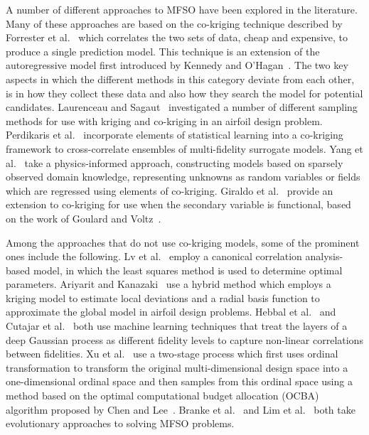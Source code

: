 \documentclass[journal]{IEEEtran}
\begin{document}
A number of different approaches to MFSO have been explored in the literature. Many of these approaches are based on the co-kriging technique described by Forrester et al.~\cite{forrester2007multi} which correlates the two sets of data, cheap and expensive, to produce a single prediction model. This technique is an extension of the autoregressive model first introduced by Kennedy and O'Hagan~\cite{kennedy2000predicting}. The two key aspects in which the different methods in this category deviate from each other, is in how they collect these data and also how they search the model for potential candidates. Laurenceau and Sagaut~\cite{laurenceau2008building} investigated a number of different sampling methods for use with kriging and co-kriging in an airfoil design problem. Perdikaris et al.~\cite{perdikaris2015multi} incorporate elements of statistical learning into a co-kriging framework to cross-correlate ensembles of multi-fidelity surrogate models. Yang et al.~\cite{yang2019physics} take a physics-informed approach, constructing models based on sparsely observed domain knowledge, representing unknowns as random variables or fields which are regressed using elements of co-kriging. Giraldo et al.~\cite{giraldo2020cokriging} provide an extension to co-kriging for use when the secondary variable is functional, based on the work of Goulard and Voltz~\cite{goulard1993geostatistical}.

Among the approaches that do not use co-kriging models, some of the prominent ones include the following. Lv et al.~\cite{lv2021multi} employ a canonical correlation analysis-based model, in which the least squares method is used to determine optimal parameters.  Ariyarit and Kanazaki~\cite{ariyarit2017multi} use a hybrid method which employs a kriging model to estimate local deviations and a radial basis function to approximate the global model in airfoil design problems. Hebbal et al.~\cite{hebbal2021multi} and Cutajar et al.~\cite{cutajar2019deep} both use machine learning techniques that treat the layers of a deep Gaussian process as different fidelity levels to capture non-linear correlations between fidelities. Xu et al.~\cite{xu2016mo2tos} use a two-stage process which first uses ordinal transformation to transform the original multi-dimensional design space into a one-dimensional ordinal space and then samples from this ordinal space using a method based on the optimal computational budget allocation (OCBA) algorithm proposed by Chen and Lee~\cite{chen2011stochastic}. Branke et al.~\cite{branke2016efficient} and Lim et al.~\cite{lim2008evolutionary} both take evolutionary approaches to solving MFSO problems.
\end{document}
